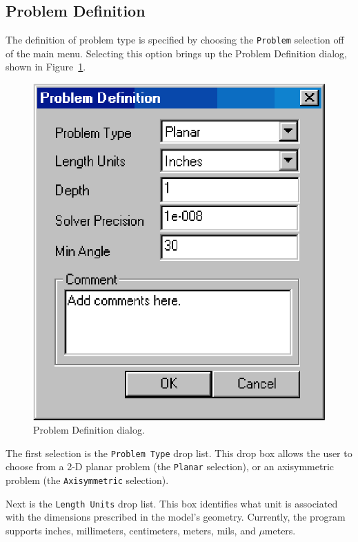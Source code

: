 \documentclass[12pt]{report}
\begin{document}
\subsection{Problem Definition}

The definition of problem type is specified by choosing the
\texttt{Problem} selection off of the main menu. Selecting this
option brings up the Problem Definition dialog, shown in
Figure~\ref{fig6}.

\begin{figure}[htbp]
\centerline{\includegraphics{belaman6.eps}}
\caption{Problem Definition dialog.}
\label{fig6}
\end{figure}

The first selection is the \texttt{Problem Type} drop list. This
drop box allows the user to choose from a 2-D planar problem (the
\texttt{Planar} selection), or an axisymmetric problem (the
\texttt{Axisymmetric} selection).





Next is the \texttt{Length Units} drop list. This box identifies
what unit is associated with the dimensions prescribed in the
model's geometry. Currently, the program supports inches,
millimeters, centimeters, meters, mils, and $\mu $meters.
\end{document}
